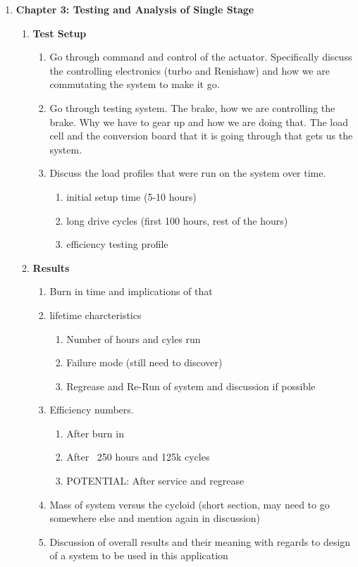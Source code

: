 \begin{enumerate}
\begin{enumerate}
	\item \textbf{Chapter 3: Testing and Analysis of Single Stage}
	\begin{enumerate}
		\item \textbf{Test Setup}
		\begin{enumerate}
			\item
			Go through command and control of the actuator. Specifically discuss the controlling electronics (turbo and Renishaw) and how we are commutating the system to make it go. 
			\item
			Go through testing system. The brake, how we are controlling the brake. Why we have to gear up and how we are doing that. The load cell and the conversion board that it is going through that gets us the system. 
			\item
			Discuss the load profiles that were run on the system over time. 
			\begin{enumerate}
				\item initial setup time (5-10 hours)
				\item long drive cycles (first 100 hours, rest of the hours) 
				\item efficiency testing profile
			\end{enumerate}
		\end{enumerate}

		\item \textbf{Results}
		\begin{enumerate}
			\item
			Burn in time and implications of that 
			\item 
			lifetime charcteristics
			\begin{enumerate}
				\item
				Number of hours and cyles run
				\item
				Failure mode (still need to discover) 
				\item
				Regrease and Re-Run of system and discussion if possible 
			\end{enumerate}
			\item
			Efficiency numbers.
			\begin{enumerate}
				\item
				After burn in 
				\item
				After ~250 hours and 125k cycles 
				\item
				POTENTIAL: After service and regrease 
			\end{enumerate}
			\item
			Mass of system versus the cycloid (short section, may need to go somewhere else and mention again in discussion)
			\item
			Discussion of overall results and their meaning with regards to design of a system to be used in this application 
		\end{enumerate}
	\end{enumerate}


\end{enumerate}
\end{enumerate}
